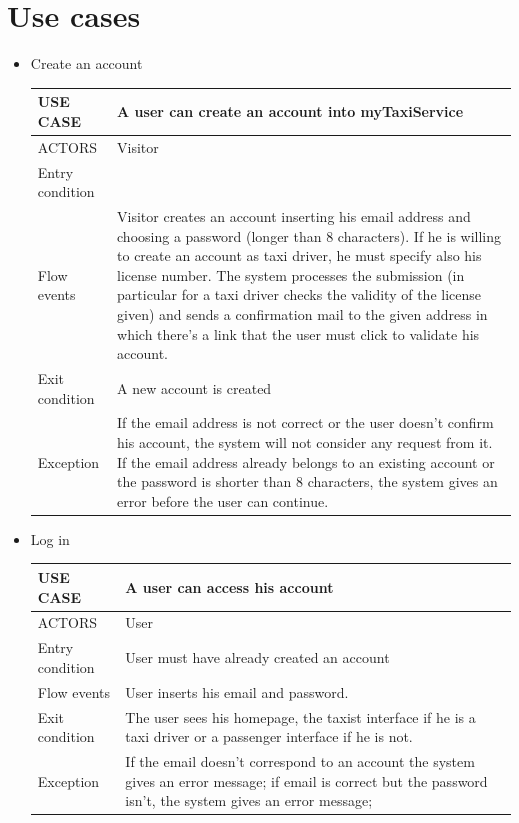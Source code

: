 \section {Use cases}
\begin{itemize}
\item Create an account
	\begin{center}
    	\begin{tabular}{ | l | p{11cm} |}
    	\hline
   	USE CASE & A user can create an account into myTaxiService \\ \hline
    	ACTORS & Visitor \\ \hline
     	Entry condition &  \\ \hline
     	Flow events & Visitor creates an account inserting his email address and choosing a password (longer than 8 characters). If he is willing to create an account as taxi driver, he must specify also his license number. The system processes the submission (in particular for a taxi driver checks the validity of the license given) and sends a confirmation mail to the given address in which there’s a link that the user must click to validate his account. \\ \hline
     	Exit condition & A new account is created \\ \hline
     	Exception &  If the email address is not correct or the user doesn’t confirm his account, the system will not consider any request from it. If the email address already belongs to an existing account or the password is shorter than 8 characters, the system gives an error before the user can continue.\\ \hline
    \end{tabular}
	\end{center}
	
\item Log in
	\begin{center}
   	 \begin{tabular}{ | l | p{11cm} |}
   	 \hline
   	USE CASE & A user can access his account\\ \hline
   	 ACTORS & User\\ \hline
    	 Entry condition & User must have already created an account \\ \hline
    	 Flow events & User inserts his email and password.\\ \hline
  	   Exit condition & The user sees his homepage, the taxist interface if he is a taxi driver or a passenger interface if he is not.\\ \hline
  	   Exception &  If the email doesn't correspond to an account the system gives an error message;
            if email is correct but the password isn't, the system gives an error message;\\ \hline
    \end{tabular}
\end{center}


\end{itemize}
